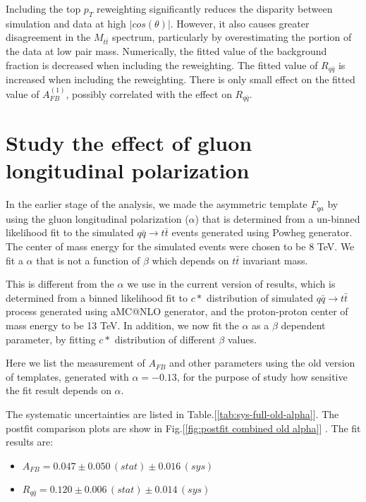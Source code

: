Including the top $p_{T}$ reweighting significantly reduces the disparity between simulation and data at high $|cos(\theta)|$. However, it also causes greater disagreement in the $M_{t\bar{t}}$ spectrum, particularly by overestimating the portion of the data at low pair mass. Numerically, the fitted value of the background fraction is decreased when including the reweighting. The fitted value of $R_{q\bar q}$ is increased when including the reweighting. There is only small effect on the fitted value of $A^{(1)}_{FB}$, possibly correlated with the effect on $R_{q\bar q}$.

\clearpage
\section{Study the effect of gluon longitudinal polarization}
In the earlier stage of the analysis, we made the asymmetric template $F_{qa}$ by using the gluon longitudinal polarization ($\alpha$) that is determined from a un-binned likelihood fit to the simulated $q\bar{q}\rightarrow t\bar{t}$ events generated using Powheg generator. The center of mass energy for the simulated events were chosen to be 8 TeV. We fit a $\alpha$ that is not a function of $\beta$ which depends on $t\bar{t}$ invariant mass.

This is different from the $\alpha$ we use in the current version of results, which is determined from a binned likelihood fit to $c*$ distribution of simulated $q\bar{q}\rightarrow t\bar{t}$ process generated using aMC@NLO generator, and the proton-proton center of mass energy to be 13 TeV. In addition, we now fit the $\alpha$ as a $\beta$ dependent parameter, by fitting $c*$ distribution of different $\beta$ values.

Here we list the measurement of $A_{FB}$ and other parameters using the old version of templates, generated with $\alpha=-0.13$, for the purpose of study how sensitive the fit result depends on $\alpha$.

The systematic uncertainties are listed in Table.[\ref{tab:sys-full-old-alpha}]. The postfit comparison plots are show in Fig.[\ref{fig:postfit combined old alpha}] .  The fit results are:
\begin{itemize}
\item $ A_{FB} = 0.047  \pm 0.050 \, (stat) \pm 0.016 \, (sys)$
\item $ R_{q\bar{q}} = 0.120  \pm 0.006 \, (stat) \pm 0.014 \, (sys) $
\end{itemize}


